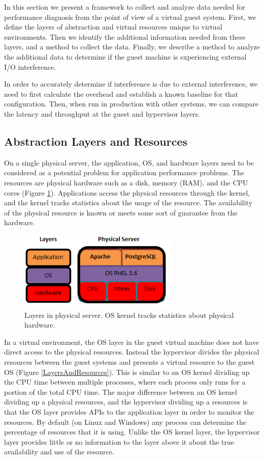In this section we present a framework to collect and analyze data needed for performance diagnosis from the point of view of a virtual guest system. 
First, we define the layers of abstraction and virtual resources unique to virtual environments.  
Then we identify the additional information needed from these layers, and a method to collect the data.
Finally, we describe a method to analyze the additional data to determine if the guest machine is experiencing external I/O interference.

In order to accurately determine if interference is due to external interference, we need to first calculate the overhead and establish a known baseline for that configuration.  Then, when run in production with other systems, we can compare the latency and throughput at the guest and hypervisor layers.  

\subsection{Abstraction Layers and Resources}
On a single physical server, the application, OS, and hardware layers need to be considered as a potential problem for application performance problems.  The resources are physical hardware such as a disk, memory (RAM), and the CPU cores (Figure \ref{PhysicalLayers}).  Applications access the physical resources through the kernel, and the kernel tracks statistics about the usage of the resource.  The availability of the physical resource is known or meets some sort of guarantee from the hardware.

\begin{figure}[!h]
  \includegraphics[width=3in]{images/LayersPhysical.png}
  \caption{Layers in physical server.  OS kernel tracks statistics about physical hardware.}
  \label{PhysicalLayers}
\end{figure}

In a virtual environment, the OS layer in the guest virtual machine does not have direct access to the physical resources.  Instead the hypervisor divides the physical resources between the guest systems and presents a virtual resource to the guest OS (Figure \ref{LayersAndResources}).
This is similar to an OS kernel dividing up the CPU time between multiple processes, where each process only runs for a portion of the total CPU time.  
The major difference between an OS kernel dividing up a physical resources, and the hypervisor dividing up a resources is that the OS layer provides APIs to the application layer in order to monitor the resources.  By default (on Linux and Windows) any process can determine the percentage of resources that it is using.  Unlike the OS kernel layer, the hypervisor layer provides little or no information to the layer above it about the true availability and use of the resource. 

